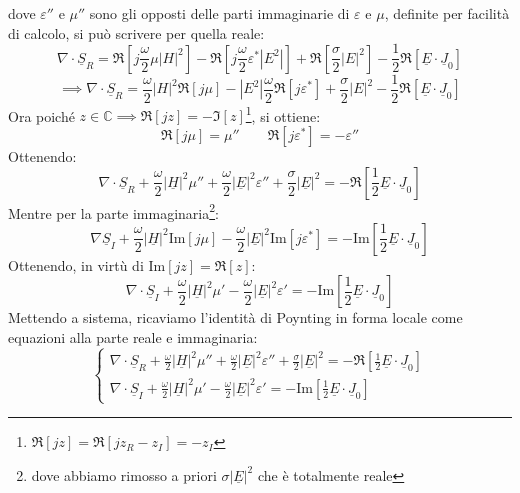 \documentclass{book}
\begin{document}
        dove $\varepsilon''$ e $\mu''$ sono gli opposti delle parti immaginarie di $\varepsilon$ e $\mu$, definite per facilità di calcolo, si può scrivere per quella reale:
        \begin{equation}
            \nabla \cdot \underline{S}_{R} = \Re[j \frac{\omega}{2}\mu |H|^{2}]-\Re[j \frac{\omega}{2}\varepsilon^{*}|E^{2}|]+\Re[\frac{\sigma}{2}|E|^{2}]-\frac{1}{2}\Re[\underline{E}\cdot \underline{J}_{0}]
        \end{equation}
        \begin{equation}
            \implies 
            \nabla \cdot \underline{S}_{R} = \frac{\omega}{2}|H|^{2}\Re[j \mu]-|E^{2}|\frac{\omega}{2}\Re[j \varepsilon^{*}]+\frac{\sigma}{2}|E|^{2}-\frac{1}{2}\Re[\underline{E}\cdot \underline{J}_{0}]
        \end{equation}
        Ora poiché $z \in \mathbb{C} \implies \Re[j z]=-\Im[z]$\footnote{$\Re[jz] = \Re[jz_{R}-z_{I}] = -z_{I}$}, si ottiene:
        \begin{equation}
            \Re[j\mu] = \mu '' \qquad \Re[j \varepsilon^{*}] = - \varepsilon''
        \end{equation}
        Ottenendo:
        \begin{equation}
            \nabla \cdot \underline{S}_{R}+\frac{\omega}{2}|\underline{H}|^{2}\mu''+\frac{\omega}{2}|\underline{E}|^{2}\varepsilon''+\frac{\sigma}{2}|\underline{E}|^{2}=-\Re[\frac{1}{2}\underline{E}\cdot \underline{J}_{0}]
        \end{equation}
        Mentre per la parte immaginaria\footnote{dove abbiamo rimosso a priori $\sigma |\underline{E}|^{2}$ che è totalmente reale}:
        \begin{equation}
            \nabla \underline{S}_{I} +\frac{\omega}{2}|\underline{H}|^{2} \textrm{Im}[j \mu]-\frac{\omega}{2}|\underline{E}|^{2}\textrm{Im}[j \varepsilon^{*}] = - \textrm{Im}[\frac{1}{2}\underline{E}\cdot \underline{J}_{0}]
        \end{equation}
        Ottenendo, in virtù di $\textrm{Im}[jz]=\Re[z]$:
        \begin{equation}
            \nabla \cdot \underline{S}_{I}+\frac{\omega}{2}|\underline{H}|^{2}\mu'-\frac{\omega}{2}|\underline{E}|^{2}\varepsilon'=-\textrm{Im}[\frac{1}{2}\underline{E}\cdot \underline{J}_{0}]
        \end{equation}
        Mettendo a sistema, ricaviamo l'identità di Poynting in forma locale come equazioni alla parte reale e immaginaria:
        \begin{equation}
        \begin{cases}
            \nabla \cdot \underline{S}_{R}+\frac{\omega}{2}|\underline{H}|^{2}\mu''+\frac{\omega}{2}|\underline{E}|^{2}\varepsilon''+\frac{\sigma}{2}|\underline{E}|^{2}=-\Re[\frac{1}{2}\underline{E}\cdot \underline{J}_{0}] \\
             \nabla \cdot \underline{S}_{I}+\frac{\omega}{2}|\underline{H}|^{2}\mu'-\frac{\omega}{2}|\underline{E}|^{2}\varepsilon'=-\textrm{Im}[\frac{1}{2}\underline{E}\cdot \underline{J}_{0}]
        \end{cases}
        \end{equation}
\end{document}
